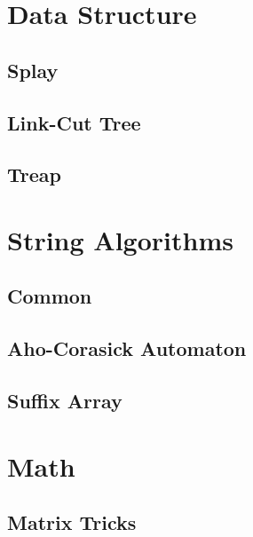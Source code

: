 \documentclass[10pt]{article}
\begin{document}
\tableofcontents
\hfill

\newpage

\section{Data Structure}
\subsection{Splay}

\subsection{Link-Cut Tree}

\subsection{Treap}

\section{String Algorithms}
\subsection{Common}

\subsection{Aho-Corasick Automaton}

\subsection{Suffix Array}

\section{Math}
\subsection{Matrix Tricks}

\end{document}
